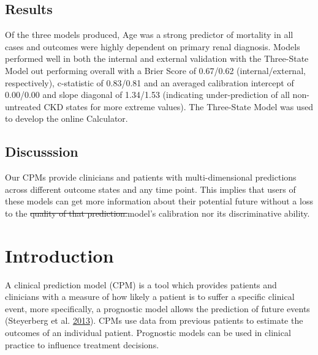 \documentclass[
]{article}
\begin{document}
\hypertarget{results}{%
\subsection*{Results}\label{results}}

Of the three models produced, Age was a strong predictor of mortality in all cases and outcomes were highly dependent on primary renal diagnosis. Models performed well in both the internal and external validation with the Three-State Model out performing overall with a Brier Score of 0.67/0.62 (internal/external, respectively), c-statistic of 0.83/0.81 and an averaged calibration intercept of 0.00/0.00 and slope diagonal of 1.34/1.53 (indicating under-prediction of all non-untreated CKD states for more extreme values). The Three-State Model was used to develop the online Calculator.

\hypertarget{discusssion}{%
\subsection*{Discusssion}\label{discusssion}}

Our CPMs provide clinicians and patients with multi-dimensional predictions across different outcome states and any time point. This implies that users of these models can get more information about their potential future without a loss to the \sout{quality of that prediction.}model's calibration nor its discriminative ability.

\hypertarget{introduction-1}{%
\section{Introduction}\label{introduction-1}}

A clinical prediction model (CPM) is a tool which provides patients and clinicians with a measure of how likely a patient is to suffer a specific clinical event, more specifically, a prognostic model allows the prediction of future events (Steyerberg et al. \protect\hyperlink{ref-steyerberg_prognosis_2013}{2013}). CPMs use data from previous patients to estimate the outcomes of an individual patient. Prognostic models can be used in clinical practice to influence treatment decisions.
\end{document}
